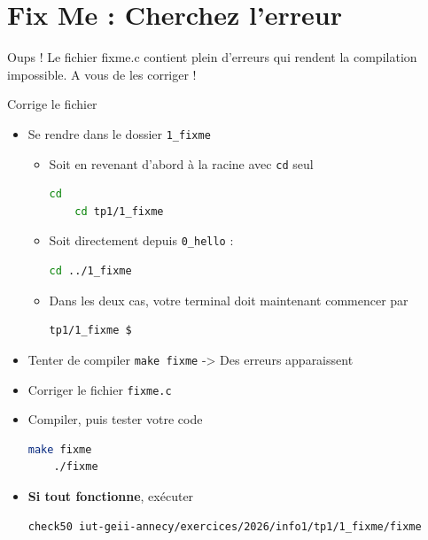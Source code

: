 \section{Fix Me : Cherchez l'erreur}

Oups ! Le fichier fixme.c contient plein d'erreurs qui rendent la compilation impossible.
A vous de les corriger !


\begin{UPSTIManipulation}{Corrige le fichier}
	\begin{itemize}
		\item[$\Box$] Se rendre dans le dossier \texttt{1\_fixme}
		      \begin{itemize}
			      \item[$\Box$] Soit en revenant d'abord à la racine avec \texttt{cd} seul
			            \begin{lstlisting}[language=bash,style=console]
	cd
	cd tp1/1_fixme
\end{lstlisting}
			      \item[$\Box$] Soit directement depuis \texttt{0\_hello} :
			            \begin{lstlisting}[language=bash,style=console]
	cd ../1_fixme
\end{lstlisting}
			      \item[$\Box$] Dans les deux cas, votre terminal doit maintenant commencer par
			            \begin{lstlisting}[language=bash,style=console]
	tp1/1_fixme $
\end{lstlisting}
		      \end{itemize}
		\item[$\Box$] Tenter de compiler \texttt{make fixme} -> Des erreurs apparaissent
		\item[$\Box$] Corriger le fichier \texttt{fixme.c}
		\item[$\Box$] Compiler, puis tester votre code
		      \begin{lstlisting}[language=bash,style=console]
	make fixme
	./fixme
\end{lstlisting}
		\item[$\Box$] \textbf{Si tout fonctionne}, exécuter
		      \begin{lstlisting}[language=bash,style=console]
check50 iut-geii-annecy/exercices/2026/info1/tp1/1_fixme/fixme
\end{lstlisting}
	\end{itemize}
\end{UPSTIManipulation}